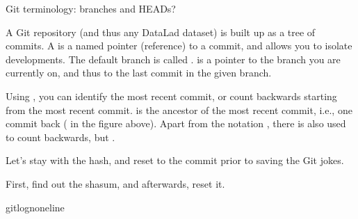 \ignorespaces \begin{findoutmore}[label={fom-git-heads}, before title={\thetcbcounter\ }, float, floatplacement=tbp, check odd page=true]{Git terminology: branches and HEADs?}
\label{\detokenize{basics/101-137-history:fom-git-heads}}

\sphinxAtStartPar
A Git repository (and thus any DataLad dataset) is built up as a tree of
commits. A  is a named pointer (reference) to a commit, and allows you
to isolate developments. The default branch is called .  is
a pointer to the branch you are currently on, and thus to the last commit
in the given branch.


\sphinxAtStartPar
Using , you can identify the most recent commit, or count backwards
starting from the most recent commit.  is the ancestor of the most
recent commit, i.e., one commit back ( in the figure above). Apart from
the notation , there is also  used to count backwards, but
.


\end{findoutmore}

\sphinxAtStartPar
Let’s stay with the hash, and reset to the commit prior to saving the Git jokes.

\newpage
\sphinxAtStartPar
First, find out the shasum, and afterwards, reset it.

\begin{sphinxVerbatim}[commandchars=\\\{\}]
gitlog\PYGZhy{}n\PYGZhy{}\PYGZhy{}oneline
\end{sphinxVerbatim}

